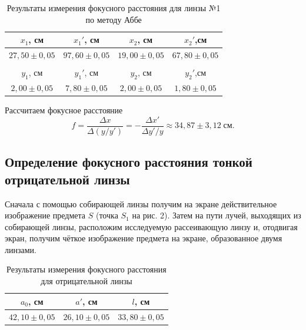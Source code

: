 \documentclass[a4paper]{article}
\begin{document}
\begin{table}[!ht]
    \centering
    \caption{Результаты измерения фокусного расстояния для линзы №1 по методу Аббе}
    \begin{tabular}{cccc}
    \hline
    \multicolumn{1}{|c|}{$x_1$, см}        & \multicolumn{1}{c|}{$x_1'$, см}      & \multicolumn{1}{c|}{$x_2$, см}        & \multicolumn{1}{c|}{$x_2'$,см}        \\ \hline
    \multicolumn{1}{|c|}{$27,50 \pm 0,05$} & \multicolumn{1}{c|}{$97,60\pm 0,05$} & \multicolumn{1}{c|}{$19,00 \pm 0,05$} & \multicolumn{1}{c|}{$67,80 \pm 0,05$} \\ \hline
    \multicolumn{1}{l}{}                   & \multicolumn{1}{l}{}                 & \multicolumn{1}{l}{}                  & \multicolumn{1}{l}{}                  \\ \hline
    \multicolumn{1}{|c|}{$y_1$, см}        & \multicolumn{1}{c|}{$y_1'$, см}      & \multicolumn{1}{c|}{$y_2$, см}        & \multicolumn{1}{c|}{$y_2'$,см}        \\ \hline
    \multicolumn{1}{|c|}{$2,00 \pm 0,05$}  & \multicolumn{1}{c|}{$7,80 \pm 0,05$} & \multicolumn{1}{c|}{$2,00 \pm 0,05$}  & \multicolumn{1}{c|}{$1,80 \pm 0,05$}  \\ \hline
    \end{tabular}
    \end{table}

    Рассчитаем фокусное расстояние $$f = \frac{\Delta x}{\Delta(y/y')} = -\frac{\Delta x'}{\Delta y'/y} \approx 34,87 \pm 3,12 \;\text{см}.$$

    \subsection{Определение фокусного расстояния тонкой отрицательной линзы}

    Сначала с помощью собирающей линзы получим на экране действительное изображение предмета $S$ (точка $S_1$ на рис. 2). Затем на пути лучей, выходящих из собирающей линзы, расположим исследуемую рассеивающую линзу и, отодвигая экран, получим чёткое изображение предмета на экране, образованное двумя линзами.

    \begin{table}[!ht]
        \centering
        \caption{Результаты измерения фокусного расстояния для отрицательной линзы}
        \begin{tabular}{|c|c|c|}
        \hline
        $a_0$, см        & $a'$, см        & $l$, см          \\ \hline
        $42,10 \pm 0,05$ & $26,10\pm 0,05$ & $33,80 \pm 0,05$ \\ \hline
        \end{tabular}
        \end{table}
\end{document}
